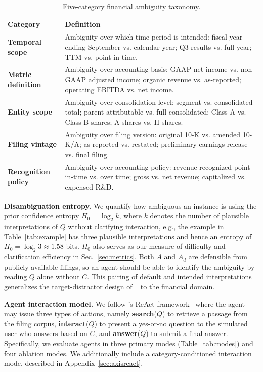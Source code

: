 \begin{table}[t]
\centering

\small
\begin{tabular}{p{}p{}}
\toprule
Category & Definition \\
\midrule
\textbf{Temporal scope} &
  Ambiguity over which time period is intended: fiscal year ending
  September vs. calendar year; Q3 results vs. full year; TTM vs.
  point-in-time. \\
\addlinespace
\textbf{Metric definition} &
  Ambiguity over accounting basis: GAAP net income vs. non-GAAP adjusted
  income; organic revenue vs. as-reported; operating EBITDA vs. net income. \\
\addlinespace
\textbf{Entity scope} &
  Ambiguity over consolidation level: segment vs. consolidated total;
  parent-attributable vs. full consolidated; Class A vs. Class B shares;
  A-shares vs. H-shares. \\
\addlinespace
\textbf{Filing vintage} &
  Ambiguity over filing version: original 10-K vs. amended 10-K/A;
  as-reported vs. restated; preliminary earnings release vs. final filing. \\
\addlinespace
\textbf{Recognition policy} &
  Ambiguity over accounting policy: revenue recognized point-in-time
  vs. over time; gross vs. net revenue; capitalized vs. expensed R\&D. \\
\bottomrule
\end{tabular}
\caption{Five-category financial ambiguity taxonomy.}
\label{tab:axes}
\end{table}

\textbf{Disambiguation entropy.} We quantify how ambiguous an instance is using the prior confidence entropy $H_{0} = \log_{2} k$, where $k$ denotes the number of plausible interpretations of $Q$ without clarifying interaction, e.g., the example in Table~\ref{tab:example} has three plausible interpretations and hence an entropy of $H_0 = \log_2 3 \approx 1.58$ bits. $H_0$ also serves as our measure of difficulty and clarification efficiency in Sec.~\ref{sec:metrics}. Both $A$ and $A_{d}$ are defensible from publicly available filings, so an agent should be able to identify the ambiguity by reading $Q$ alone without $C$. This pairing of default and intended interpretations generalizes the target-distractor design of \interactcomp~\citep{interactcomp2026} to the financial domain.

\textbf{Agent interaction model.} We follow \interactcomp's ReAct framework~\citep{yao2023react} where the agent may issue three types of actions, namely \textbf{search}($Q$) to retrieve a passage from the filing corpus, \textbf{interact}($Q$) to present a yes-or-no question to the simulated user who answers based on $C$, and \textbf{answer}($Q$) to submit a final answer. Specifically, we evaluate agents in three primary modes (Table~\ref{tab:modes}) and four
ablation modes. We additionally include a category-conditioned interaction mode, described in
Appendix~\ref{sec:axisreact}.

